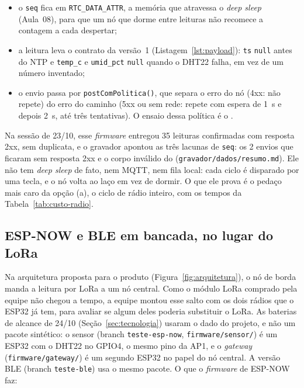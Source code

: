 \begin{itemize}
  \item o \texttt{seq} fica em \texttt{RTC\_DATA\_ATTR}, a memória que
    atravessa o \emph{deep sleep} (Aula~08), para que um nó que dorme
    entre leituras não recomece a contagem a cada despertar;
  \item a leitura leva o contrato da versão~1 (Listagem~\ref{lst:payload}):
    \texttt{ts} \texttt{null} antes do NTP e \texttt{temp\_c} e
    \texttt{umid\_pct} \texttt{null} quando o DHT22 falha, em vez de um
    número inventado;
  \item o envio passa por \texttt{postComPolitica()}, que separa o erro
    do nó (4xx: não repete) do erro do caminho (5xx ou sem rede: repete
    com espera de \SI{1}{\second} e depois \SI{2}{\second}, até três
    tentativas). O ensaio dessa política é o .
\end{itemize}

Na sessão de 23/10, esse \emph{firmware} entregou 35 leituras
confirmadas com resposta 2xx, sem duplicata, e o gravador apontou as
três lacunas de \texttt{seq}: os 2 envios que ficaram sem resposta 2xx e
o corpo inválido do  (\texttt{gravador/dados/resumo.md}). Ele não tem \emph{deep sleep} de
fato, nem MQTT, nem fila local: cada ciclo é disparado por uma tecla, e
o nó volta ao laço em vez de dormir. O que ele prova é o pedaço mais caro
da opção (a), o ciclo de rádio inteiro, com os tempos da
Tabela~\ref{tab:custo-radio}.

\subsection{ESP-NOW e BLE em bancada, no lugar do LoRa}
\label{sec:espnow-bancada}
Na arquitetura proposta para o produto (Figura~\ref{fig:arquitetura}),
o nó de borda manda a leitura por LoRa a um nó central. Como o módulo
LoRa comprado pela equipe não chegou a tempo, a equipe montou esse salto
com os dois rádios que o ESP32 já tem, para avaliar se algum deles
poderia substituir o LoRa. As baterias de alcance de 24/10
(Seção~\ref{sec:tecnologia}) usaram o dado do projeto, e não um pacote
sintético: o sensor
(branch \texttt{teste-esp-now}, \texttt{firmware/sensor/}) é um ESP32
com o DHT22 no GPIO4, o mesmo pino da AP1, e o \emph{gateway}
(\texttt{firmware/gateway/}) é um segundo ESP32 no papel do nó central.
A versão BLE (branch \texttt{teste-ble}) usa o mesmo pacote. O que o
\emph{firmware} de ESP-NOW faz:

